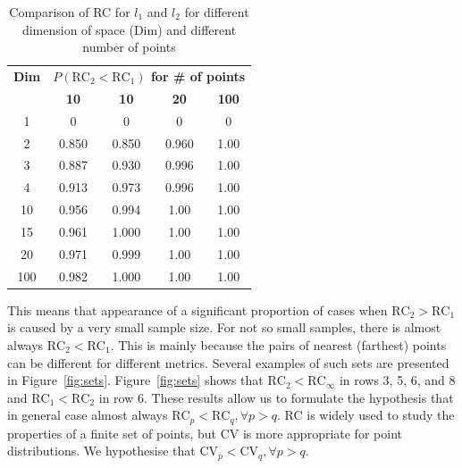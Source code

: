 \documentclass[entropy,article,submit,moreauthors,pdftex]{Definitions/mdpi}
\begin{document}
\begin{table}[tb]
\caption{Comparison of RC for $l_1$ and $l_2$ for different dimension of space (Dim) and different number of points}
\centering
\begin{tabular}{|c|c|c|c|c|}
\hline
\textbf{Dim}&\multicolumn{4}{|c|}{\textbf{$P(\text{RC}_2<\text{RC}_1)$ for \# of points}} \\
\cline{2-5}
 & \textbf{10 \cite{aggarwal2001}} & \textbf{10} & \textbf{20} & \textbf{100} \\
\hline
  1 & 0 & 0 & 0 & 0 \\ \hline
  2 & 0.850 & 0.850 & 0.960 & 1.00 \\ \hline
  3 & 0.887 & 0.930 & 0.996 & 1.00 \\ \hline
  4 & 0.913 & 0.973 & 0.996 & 1.00 \\ \hline
 10 & 0.956 & 0.994 & 1.00 & 1.00 \\ \hline
 15 & 0.961 & 1.000 & 1.00 & 1.00 \\ \hline
 20 & 0.971 & 0.999 & 1.00 & 1.00 \\ \hline
100 & 0.982 & 1.000 & 1.00 & 1.00 \\ \hline

\end{tabular}
\label{tab:RCComp}
\end{table}

This means that appearance of a significant proportion of cases when $\text{RC}_2>\text{RC}_1$ is caused by a very small sample size. For not so small samples, there is almost always $\text{RC}_2<\text{RC}_1$.
This is mainly because the pairs of nearest (farthest) points can be different for different metrics.
Several examples of such sets are presented in Figure~\ref{fig:sets}.
Figure~\ref{fig:sets} shows that $\text{RC}_2<\text{RC}_\infty$ in rows 3, 5, 6, and 8 and $\text{RC}_1<\text{RC}_2$ in row 6. These results allow us to formulate the hypothesis that in general case almost always $\text{RC}_p<\text{RC}_q, \forall p>q$. RC is widely used to study the properties of a finite set of points, but CV is more appropriate for point distributions. We hypothesise that $\text{CV}_p<\text{CV}_q, \forall p>q$.
\end{document}
